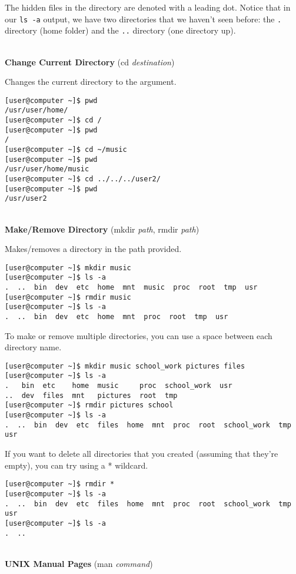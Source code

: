 \documentclass[11pt,oneside]{article}
\newenvironment{articleSectionN}[1]
{#1}
{}
\begin{document}
\begin{articleSectionN}
    The hidden files in the directory are denoted with a leading dot. Notice that in our \lstinline{ls -a} output, we have two directories that we haven't seen before: the \lstinline{.} directory (home folder) and the \lstinline{..} directory (one directory up).

\quad \\
\noindent\textbf{Change Current Directory} (cd \emph{destination})

Changes the current directory to the argument.

\begin{lstlisting}
[user@computer ~]$ pwd
/usr/user/home/
[user@computer ~]$ cd /
[user@computer ~]$ pwd
/
[user@computer ~]$ cd ~/music
[user@computer ~]$ pwd
/usr/user/home/music
[user@computer ~]$ cd ../../../user2/
[user@computer ~]$ pwd
/usr/user2
\end{lstlisting}

\quad \\
\noindent\textbf{Make/Remove Directory} (mkdir \emph{path}, rmdir \emph{path})

Makes/removes a directory in the path provided.

\begin{lstlisting}
[user@computer ~]$ mkdir music
[user@computer ~]$ ls -a
.  ..  bin  dev  etc  home  mnt  music  proc  root  tmp  usr
[user@computer ~]$ rmdir music
[user@computer ~]$ ls -a
.  ..  bin  dev  etc  home  mnt  proc  root  tmp  usr
\end{lstlisting}

To make or remove multiple directories, you can use a space between each directory name.

\begin{lstlisting}
[user@computer ~]$ mkdir music school_work pictures files
[user@computer ~]$ ls -a
.   bin  etc    home  music     proc  school_work  usr
..  dev  files  mnt   pictures  root  tmp
[user@computer ~]$ rmdir pictures school
[user@computer ~]$ ls -a
.  ..  bin  dev  etc  files  home  mnt  proc  root  school_work  tmp  usr
\end{lstlisting}

If you want to delete all directories that you created (assuming that they're empty), you can try using a * wildcard.

\begin{lstlisting}
[user@computer ~]$ rmdir *
[user@computer ~]$ ls -a
.  ..  bin  dev  etc  files  home  mnt  proc  root  school_work  tmp  usr
[user@computer ~]$ ls -a
.  ..
\end{lstlisting}
\newpage
\quad \\
\noindent\textbf{UNIX Manual Pages} (man \emph{command})


\end{articleSectionN}
\end{document}
